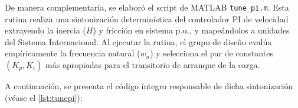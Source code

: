\documentclass[conference]{IEEEtran}
\begin{document}
\begin{table}[H]
    \centering
    \caption{Parámetros de la Máquina de Inducción}
    \label{tab:parametros}
\end{table}

De manera complementaria, se elaboró el script de MATLAB \texttt{tune\_pi.m}. Esta rutina realiza una sintonización determinística del controlador PI de velocidad extrayendo la inercia ($H$) y fricción en sistema p.u., y mapeándolos a unidades del Sistema Internacional. Al ejecutar la rutina, el grupo de diseño evalúa empíricamente la frecuencia natural ($w_n$) y selecciona el par de constantes $(K_p, K_i)$ más apropiadas para el transitorio de arranque de la carga.

A continuación, se presenta el código íntegro responsable de dicha sintonización (véase el \autoref{lst:tunepi}):
\end{document}
